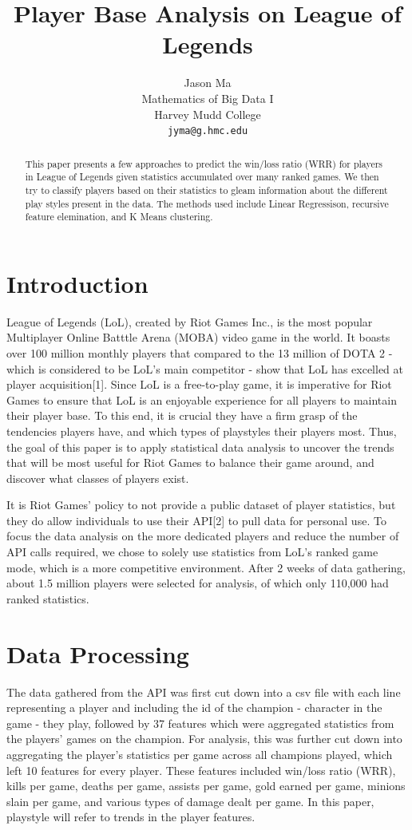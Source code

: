 \documentclass{article}
\title{Player Base Analysis on League of Legends}
\author{
	Jason Ma \\
	Mathematics of Big Data I \\
	Harvey Mudd College \\
	\texttt{jyma@g.hmc.edu}   }
\begin{document}
	\maketitle

	\begin{abstract}
	This paper presents a few approaches to predict the win/loss ratio (WRR) for players in League of Legends given statistics accumulated over many ranked games. We then try to classify players based on their statistics to gleam information about the different play styles present in the data. The methods used include Linear Regressison, recursive feature elemination, and K Means clustering. 
	\end{abstract}
	
	\section{Introduction}
	League of Legends (LoL), created by Riot Games Inc., is the most popular Multiplayer Online Batttle Arena (MOBA) video game in the world. It boasts over 100 million monthly players that compared to the 13 million of DOTA 2 - which is considered to be LoL's main competitor - show that LoL has excelled at player acquisition[1]. Since LoL is a free-to-play game, it is imperative for Riot Games to ensure that LoL is an enjoyable experience for all players to maintain their player base. 
	To this end, it is crucial they have a firm grasp of the tendencies players have, and which types of playstyles their players most. Thus, the goal of this paper is to apply statistical data analysis to uncover the trends that will be most useful for Riot Games to balance their game around, and discover what classes of players exist.
	
	It is Riot Games' policy to not provide a public dataset of player statistics, but they do allow individuals to use their API[2] to pull data for personal use. To focus the data analysis on the more dedicated players and reduce the number of API calls required, we chose to solely use statistics from LoL's ranked game mode, which is a more competitive environment. After 2 weeks of data gathering, about 1.5 million players were selected for analysis, of which only 110,000 had ranked statistics. 
	
	\section{Data Processing}
	The data gathered from the API was first cut down into a csv file with each line representing a player and including the id of the champion - character in the game -  they play, followed by 37 features which were aggregated statistics from the players' games on the champion. For analysis, this was further cut down into aggregating the player's statistics per game across all champions played, which left 10 features for every player. These features included win/loss ratio (WRR), kills per game, deaths per game, assists per game, gold earned per game, minions slain per game, and various types of damage dealt per game. In this paper, playstyle will refer to trends in the player features.
	
\end{document}
